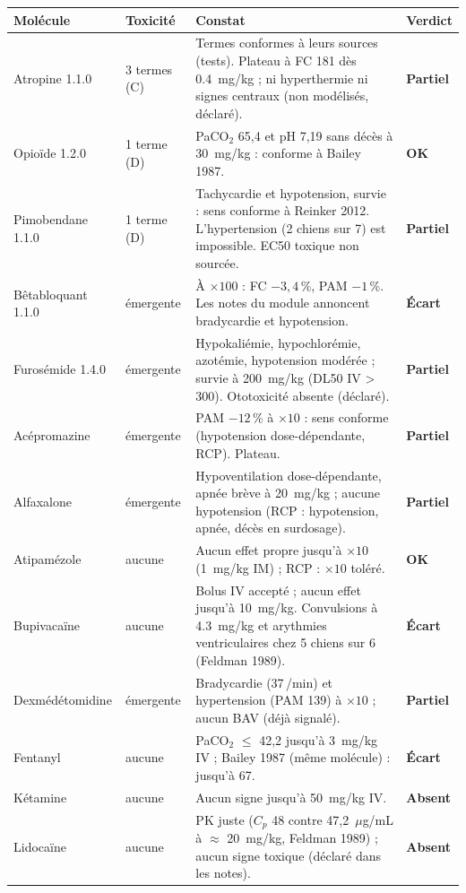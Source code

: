 \documentclass[10pt,a4paper]{article}
\newcommand{\ok}{\textcolor{green!45!black}{\textbf{OK}}}
\newcommand{\ecart}{\textcolor{red!70!black}{\textbf{Écart}}}
\newcommand{\partiel}{\textcolor{orange!80!black}{\textbf{Partiel}}}
\newcommand{\absent}{\textcolor{red!70!black}{\textbf{Absent}}}
\begin{document}
\begin{longtable}{P{2.6cm}P{2.3cm}P{9.2cm}P{1.5cm}}
\toprule
Molécule & Toxicité & Constat & Verdict\\
\midrule
\endhead
Atropine 1.1.0 & 3 termes (C) & Termes conformes à leurs sources (tests). Plateau à FC 181 dès \SI{0,4}{mg/kg} ; ni hyperthermie ni signes centraux (non modélisés, déclaré). & \partiel\\
Opioïde 1.2.0 & 1 terme (D) & PaCO$_2$ 65,4 et pH 7,19 sans décès à \SI{30}{mg/kg} : conforme à Bailey 1987. & \ok\\
Pimobendane 1.1.0 & 1 terme (D) & Tachycardie et hypotension, survie : sens conforme à Reinker 2012. L'hypertension (2 chiens sur 7) est impossible. EC50 toxique non sourcée. & \partiel\\
Bêtabloquant 1.1.0 & émergente & À $\times 100$ : FC $-3{,}4$\,\%, PAM $-1$\,\%. Les notes du module annoncent bradycardie et hypotension. & \ecart\\
Furosémide 1.4.0 & émergente & Hypokaliémie, hypochlorémie, azotémie, hypotension modérée ; survie à \SI{200}{mg/kg} (DL50 IV > 300). Ototoxicité absente (déclaré). & \partiel\\
Acépromazine & émergente & PAM $-12$\,\% à $\times 10$ : sens conforme (hypotension dose-dépendante, RCP). Plateau. & \partiel\\
Alfaxalone & émergente & Hypoventilation dose-dépendante, apnée brève à \SI{20}{mg/kg} ; aucune hypotension (RCP : hypotension, apnée, décès en surdosage). & \partiel\\
Atipamézole & aucune & Aucun effet propre jusqu'à $\times 10$ (\SI{1}{mg/kg} IM) ; RCP : $\times 10$ toléré. & \ok\\
Bupivacaïne & aucune & Bolus IV accepté ; aucun effet jusqu'à \SI{10}{mg/kg}. Convulsions à \SI{4,3}{mg/kg} et arythmies ventriculaires chez 5 chiens sur 6 (Feldman 1989). & \ecart\\
Dexmédétomidine & émergente & Bradycardie (37\,/min) et hypertension (PAM 139) à $\times 10$ ; aucun BAV (déjà signalé). & \partiel\\
Fentanyl & aucune & PaCO$_2$ $\leq$ 42,2 jusqu'à \SI{3}{mg/kg} IV ; Bailey 1987 (même molécule) : jusqu'à 67. & \ecart\\
Kétamine & aucune & Aucun signe jusqu'à \SI{50}{mg/kg} IV. & \absent\\
Lidocaïne & aucune & PK juste ($C_p$ 48 contre 47,2~$\mu$g/mL à $\approx$ \SI{20}{mg/kg}, Feldman 1989) ; aucun signe toxique (déclaré dans les notes). & \absent\\

\end{longtable}
\end{document}
